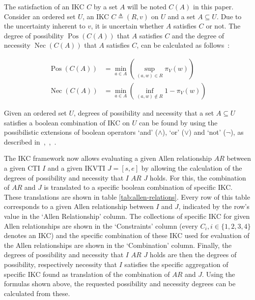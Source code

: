 \documentclass[runningheads,a4paper]{llncs}
\newcommand{\Pos}{\operatorname{Pos}}
\newcommand{\Nec}{\operatorname{Nec}}
\begin{document}
The satisfaction of an IKC $C$ by a set $A$ will be noted $C(A)$ in this paper. Consider an ordered set $U$, an IKC $C \triangleq (R,v)$ on $U$ and a set $A \subseteq U$. Due to the uncertainty inherent to $v$, it is uncertain whether $A$ satisfies $C$ or not. The degree of possibility $\Pos(C(A))$ that $A$ satisfies $C$ and the degree of necessity $\Nec(C(A))$ that $A$ satisfies $C$, can be calculated as follows~\cite{Pons2013ijufkbs}:

\vspace{-10pt}
\begin{align}
\Pos(C(A)) & = \min_{a \in A}\left(\sup_{(a,w) \in R}\pi_{V}(w)\right) \label{ill-known-pos}\\
\Nec(C(A)) & = \min_{a \in A}\left(\inf_{(a,w) \notin R} 1-\pi_{V}(w)\right) \label{ill-known-nec}
\end{align}

Given an ordered set $U$, degrees of possibility and necessity that a set $A \subseteq U$ satisfies a boolean combination of IKC on $U$ can be found by using the possibilistic extensions of boolean operators `and' ($\wedge$), `or' ($\vee$) and `not' ($\neg$), as described in~\cite{Pons2013ijufkbs},~\cite{Pons2012ipmu},~\cite{Billiet2012ipmu}.

The IKC framework now allows evaluating a given Allen relationship $AR$ between a given CTI $I$ and a given IKVTI $J = \left[s, e\right]$ by allowing the calculation of the degrees of possibility and necessity that $I$ $AR$ $J$ holds. For this, the combination of $AR$ and $J$ is translated to a specific boolean combination of specific IKC. These translations are shown in table \ref{tab:allen-relations}. Every row of this table corresponds to a given Allen relationship between $I$ and $J$, indicated by the row's value in the `Allen Relationship' column. The collections of specific IKC for given Allen relationships are shown in the `Constraints' column (every $C_i, i \in \{1, 2, 3, 4\}$ denotes an IKC) and the specific combination of these IKC used for evaluation of the Allen relationships are shown in the `Combination' column. Finally, the degrees of possibility and necessity that $I$ $AR$ $J$ holds are then the degrees of possibility, respectively necessity that $I$ satisfies the specific aggregation of specific IKC found as translation of the combination of $AR$ and $J$. Using the formulas shown above, the requested possibility and necessity degrees can be calculated from these.
\end{document}
